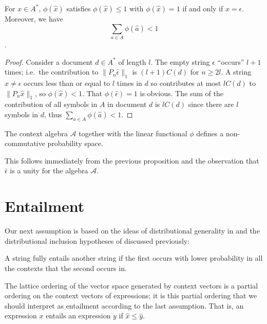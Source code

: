 \documentclass[11pt]{report}
\begin{document}
\begin{prop}
For $x \in A^*$, $\phi(\hat{x})$ satisfies $\phi(\hat{x}) \le 1$ with $\phi(\hat{x}) = 1$ if and only if $x = \epsilon$. Moreover, we have
$$\sum_{a \in A} \phi(\hat{a}) < 1$$.
\end{prop}

\begin{proof}
Consider a document $d\in A^*$ of length $l$. The empty string $\epsilon$ ``occurs'' $l+1$ times; i.e.~the contribution to $\|P_n \hat{\epsilon}\|_1$ is $(l+1)C(d)$ for $n \ge 2l$. A string $x \neq \epsilon$ occurs less than or equal to $l$ times in $d$ so contributes at most $lC(d)$ to $\|P_n\hat{x}\|_1$, so $\phi(\hat{x}) < 1$. That $\phi(\hat{\epsilon}) = 1$ is obvious. The sum of the contribution of all symbols in $A$ in document $d$ is $lC(d)$ since there are $l$ symbols in $d$, thus $\sum_{a \in A} \phi(\hat{a}) < 1$.
\end{proof}

\begin{prop}
The context algebra $\mathcal{A}$ together with the linear functional $\phi$ defines a non-commutative probability space.
\end{prop}

This follows immediately from the previous proposition and the observation that $\hat{\epsilon}$ is a unity for the algebra $\mathcal{A}$.

\section{Entailment}


Our next assumption is based on the ideas of distributional generality in \citep{Weeds:04} and the distributional inclusion hypotheses of \cite{Geffet:05} discussed previously:
\begin{assumption} A string fully entails another string if the first occurs with lower probability in all the contexts that the second occurs in.
\end{assumption}\noindent
The lattice ordering of the vector space generated by context vectors is a partial ordering on the context vectors of expressions; it is this partial ordering that we should interpret as entailment according to the last assumption. That is, an expression $x$ entails an expression $y$ if $\hat{x} \le \hat{y}$.
\end{document}
